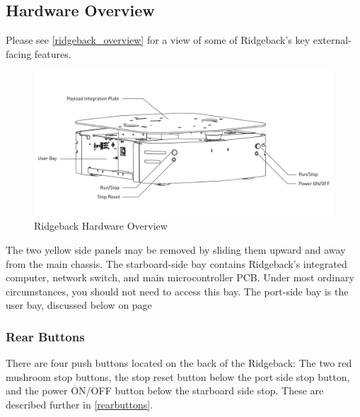 \documentclass[]{clearpath-latex/clearpath-manual}
\begin{document}
\pagebreak[4]
\subsection{Hardware Overview}

Please see \autoref{ridgeback_overview} for a view of some of Ridgeback's key external-facing features.

\begin{figure}[h]
  \centering
  \includegraphics[width=1\linewidth]{Ridgeback_Rear_Drawing_Labeled.pdf}
  \caption{Ridgeback Hardware Overview}
  \label{ridgeback_overview}
\end{figure}

The two yellow side panels may be removed by sliding them upward and away from the main chassis. The starboard-side bay contains Ridgeback's integrated computer, network switch, and main microcontroller PCB. Under most ordinary circumstances, you should not need to access this bay. The port-side bay is the user bay, discussed below on page \pageref{userbay}


\pagebreak[4]
\subsubsection{Rear Buttons}

There are four push buttons located on the back of the Ridgeback: The two red mushroom stop buttons, the stop reset button below the port side stop button, and the power ON/OFF button below the starboard side stop. These are described further in \autoref{rearbuttons}.
\end{document}
